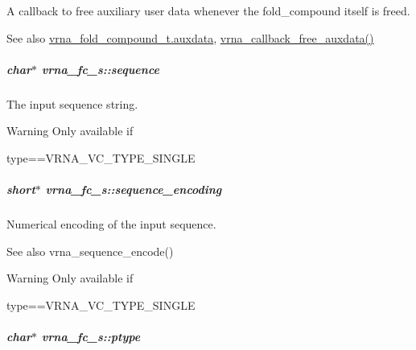 A callback to free auxiliary user data whenever the fold\+\_\+compound itself is free\textquotesingle{}d. 

\begin{DoxySeeAlso}{See also}
\hyperlink{group__fold__compound_a20048e0c369e9f24b55423d600037c68}{vrna\+\_\+fold\+\_\+compound\+\_\+t.\+auxdata}, \hyperlink{group__fold__compound_ga3ae51bfd5fc3236652d1de4e3274b49b}{vrna\+\_\+callback\+\_\+free\+\_\+auxdata()} 
\end{DoxySeeAlso}
\hypertarget{group__fold__compound_a87f6abcda89cfb7a486c97e1f5371525}{}
\subparagraph[{sequence}]{\setlength{\rightskip}{0pt plus 5cm}char$\ast$ vrna\+\_\+fc\+\_\+s\+::sequence}\label{group__fold__compound_a87f6abcda89cfb7a486c97e1f5371525}


The input sequence string. 

\begin{DoxyWarning}{Warning}
Only available if\begin{DoxyVerb}type==VRNA_VC_TYPE_SINGLE \end{DoxyVerb}
 
\end{DoxyWarning}
\hypertarget{group__fold__compound_a9934bdb695d35a3544285cbcc19f9763}{}
\subparagraph[{sequence\+\_\+encoding}]{\setlength{\rightskip}{0pt plus 5cm}short$\ast$ vrna\+\_\+fc\+\_\+s\+::sequence\+\_\+encoding}\label{group__fold__compound_a9934bdb695d35a3544285cbcc19f9763}


Numerical encoding of the input sequence. 

\begin{DoxySeeAlso}{See also}
vrna\+\_\+sequence\+\_\+encode() 
\end{DoxySeeAlso}
\begin{DoxyWarning}{Warning}
Only available if\begin{DoxyVerb}type==VRNA_VC_TYPE_SINGLE \end{DoxyVerb}
 
\end{DoxyWarning}
\hypertarget{group__fold__compound_a3fbea559f1d1976b2d67c215cdeee0b2}{}
\subparagraph[{ptype}]{\setlength{\rightskip}{0pt plus 5cm}char$\ast$ vrna\+\_\+fc\+\_\+s\+::ptype}\label{group__fold__compound_a3fbea559f1d1976b2d67c215cdeee0b2}


